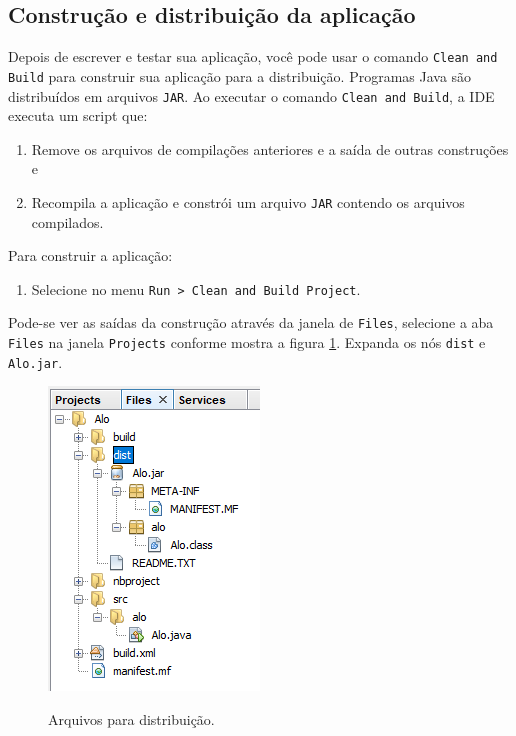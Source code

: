 \documentclass[
	12pt,				%
	twoside,			%
	a4paper,			%
	english,			%
	french,				%
	spanish,			%
	brazil				%
	]{abntex2}
\begin{document}
\subsection{Construção e distribuição da aplicação}

Depois de escrever e testar sua aplicação, você pode usar o comando \texttt{Clean and Build} para construir sua aplicação para a distribuição. Programas Java são distribuídos em arquivos \texttt{JAR}. Ao executar o comando \texttt{Clean and Build}, a IDE executa um script que:
\begin{enumerate}
\item Remove os arquivos de compilações anteriores e a saída de outras construções e
\item Recompila a aplicação e constrói um arquivo \texttt{JAR} contendo os arquivos compilados.
\end{enumerate}

Para construir a aplicação:
\begin{enumerate}
\item Selecione no menu \texttt{Run > Clean and Build Project}.
\end{enumerate}

Pode-se ver as saídas da construção através da janela de \texttt{Files}, selecione a aba \texttt{Files} na janela \texttt{Projects} conforme mostra a figura \ref{fig:navFile}. Expanda os nós \texttt{dist} e \texttt{Alo.jar}.

\begin{figure}[h]
\begin{center}
\includegraphics[scale=0.4]{navFile.png} 
\caption{Arquivos para distribuição.}
\label{fig:navFile}
\end{center}
\end{figure}
\end{document}
